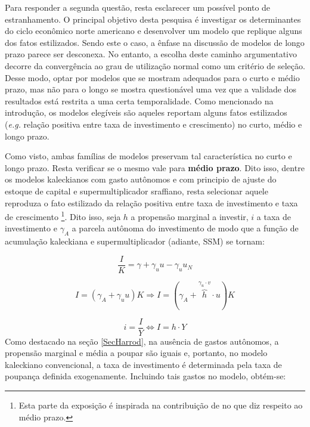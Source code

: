 Para responder a segunda questão, resta esclarecer um possível ponto de estranhamento. O principal objetivo desta pesquisa é investigar os determinantes do ciclo econômico norte americano e desenvolver um modelo que replique alguns dos fatos estilizados. Sendo este o caso, a ênfase na discussão de modelos de longo prazo parece ser desconexa. No entanto, a escolha deste caminho argumentativo decorre da convergência ao grau de utilização normal como um critério de seleção. Desse modo, optar por modelos que se mostram adequados para o curto e médio prazo, mas não para o longo se mostra questionável uma vez que a validade dos resultados está restrita a uma certa temporalidade. Como mencionado na introdução, os modelos elegíveis são aqueles reportam alguns fatos estilizados (\textit{e.g.} relação positiva entre taxa de investimento e crescimento)  no curto, médio e longo prazo.

Como visto, ambas famílias de modelos preservam tal característica no curto e longo prazo. Resta verificar se o mesmo vale para \textbf{médio prazo}. Dito isso, dentre os modelos kaleckianos com gasto autônomos e com principio de ajuste do estoque de capital e supermultiplicador sraffiano, resta selecionar aquele reproduza o fato estilizado da relação positiva entre taxa de investimento e taxa de crescimento \cites[p.~172]{cesaratto_neo-kaleckian_2015}[p.~8--9]{fiebiger_trend_2017}\footnote{Esta parte da exposição é inspirada na contribuição de \textcite{fagundes_role_2017} no que diz respeito ao médio prazo.}. Dito isso, seja $h$ a propensão marginal a investir, $i$ a taxa de investimento e $\gamma_A$ a parcela autônoma do investimento de modo que a função de acumulação kaleckiana e supermultiplicador (adiante, SSM) se tornam:

$$
\frac{I}{K}  = \gamma + \gamma_uu - \gamma_uu_N
$$


\begin{equation}
\tag{kaleckiana}
I = (\gamma_A + \gamma_uu)K \Rightarrow I = (\gamma_A + \overbrace{h}^{\gamma_u\cdot v}\cdot u)K
\end{equation}

\begin{equation}
\tag{SSM}
i = \frac{I}{Y} \Leftrightarrow I = h\cdot Y
\end{equation}
Como destacado na seção \ref{SecHarrod}, na ausência de gastos autônomos, a propensão marginal e média a poupar são iguais e, portanto, no modelo kaleckiano convencional, a taxa de investimento é determinada pela taxa de poupança definida exogenamente. Incluindo tais gastos no modelo, obtém-se:

